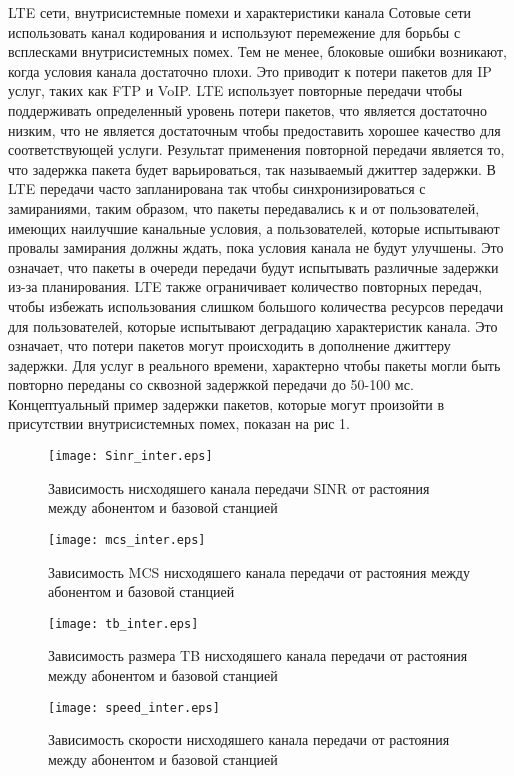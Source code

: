 LTE сети, внутрисистемные помехи и характеристики канала
Сотовые сети использовать канал кодирования и используют перемежение для борьбы с всплесками внутрисистемных помех. Тем не менее, блоковые ошибки возникают, когда условия канала достаточно плохи. Это приводит к потери пакетов для IP услуг, таких как FTP и VoIP. LTE использует повторные передачи чтобы поддерживать определенный уровень потери пакетов, что является достаточно низким, что не является достаточным чтобы предоставить хорошее качество для соответствующей услуги. Результат применения повторной передачи является то, что задержка пакета будет варьироваться, так называемый джиттер задержки.
В LTE передачи часто запланирована так чтобы синхронизироваться с замираниями, таким образом, что пакеты передавались к и от пользователей, имеющих наилучшие канальные условия, а пользователей, которые испытывают провалы замирания должны ждать, пока условия канала не будут улучшены. Это означает, что пакеты в очереди передачи будут испытывать различные задержки из-за планирования.
LTE также ограничивает количество повторных передач, чтобы избежать использования слишком большого количества ресурсов передачи для пользователей, которые испытывают деградацию характеристик канала. Это означает, что потери пакетов могут происходить в дополнение джиттеру задержки. Для услуг в реального времени, характерно чтобы пакеты могли быть повторно переданы со сквозной задержкой передачи до 50-100 мс.
Концептуальный пример задержки пакетов, которые могут произойти в присутствии внутрисистемных помех, показан на рис 1.

\begin{figure} [h]
  \center
\texttt{[image: Sinr\_inter.eps]}
  \caption{Зависимость нисходяшего канала передачи SINR от растояния между абонентом и базовой станцией}
  \label{img:Sinr_inter}
\end{figure}

\begin{figure} [h]
  \center
\texttt{[image: mcs\_inter.eps]}
  \caption{Зависимость MCS нисходяшего канала передачи от растояния между абонентом и базовой станцией}
  \label{img:mcs_inter}
\end{figure}

\begin{figure} [h]
  \center
\texttt{[image: tb\_inter.eps]}
  \caption{Зависимость размера TB нисходяшего канала передачи от растояния между абонентом и базовой станцией}
  \label{img:tb_inter}
\end{figure}

\begin{figure} [h]
  \center
\texttt{[image: speed\_inter.eps]}
  \caption{Зависимость скорости нисходяшего канала передачи от растояния между абонентом и базовой станцией}
  \label{img:speed_inter}
\end{figure}


\clearpage




